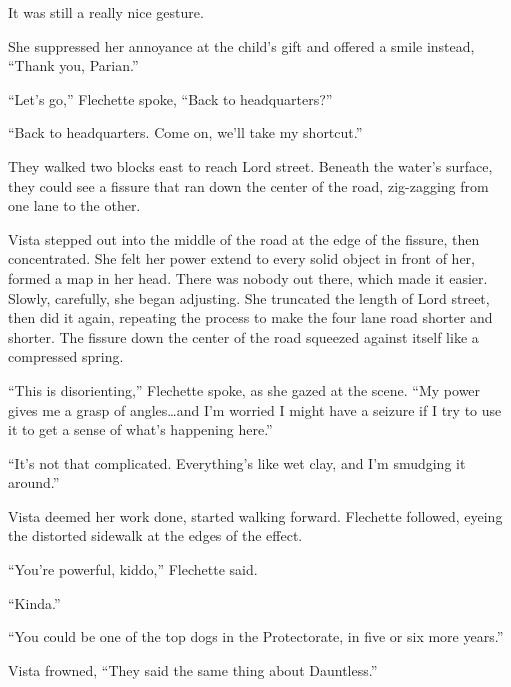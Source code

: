 It was still a really nice gesture.



She suppressed her annoyance at the child's gift and offered a smile instead, ``Thank you, Parian.''



``Let's go,'' Flechette spoke, ``Back to headquarters?''



``Back to headquarters.  Come on, we'll take my shortcut.''



They walked two blocks east to reach Lord street.  Beneath the water's surface, they could see a fissure that ran down the center of the road, zig-zagging from one lane to the other.



Vista stepped out into the middle of the road at the edge of the fissure, then concentrated.  She felt her power extend to every solid object in front of her, formed a map in her head.  There was nobody out there, which made it easier.  Slowly, carefully, she began adjusting.  She truncated the length of Lord street, then did it again, repeating the process to make the four lane road shorter and shorter.  The fissure down the center of the road squeezed against itself like a compressed spring.



``This is disorienting,'' Flechette spoke, as she gazed at the scene.  ``My power gives me a grasp of angles\ldots and I'm worried I might have a seizure if I try to use it to get a sense of what's happening here.''



``It's not that complicated.  Everything's like wet clay, and I'm smudging it around.''



Vista deemed her work done, started walking forward.  Flechette followed, eyeing the distorted sidewalk at the edges of the effect.



``You're powerful, kiddo,'' Flechette said.



``Kinda.''



``You could be one of the top dogs in the Protectorate, in five or six more years.''



Vista frowned, ``They said the same thing about Dauntless.''



